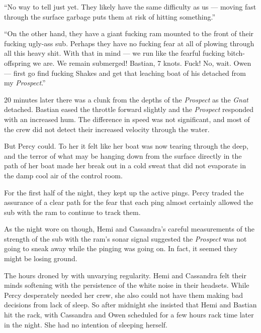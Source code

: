 \documentclass[]{scrbook}
\begin{document}
``No way to tell just yet. They likely have the same difficulty as us
--- moving fast through the surface garbage puts them at risk of hitting
something.''

``On the other hand, they have a giant fucking ram mounted to the front
of their fucking ugly-ass sub. Perhaps they have no fucking fear at all
of plowing through all this heavy shit. With that in mind --- we run
like the fearful fucking bitch-offspring we are. We remain submerged!
Bastian, 7 knots. Fuck! No, wait. Owen --- first go find fucking Shakes
and get that leaching boat of his detached from my \emph{Prospect}.''

20 minutes later there was a clunk from the depths of the
\emph{Prospect} as the \emph{Gnat} detached. Bastian eased the throttle
forward slightly and the \emph{Prospect} responded with an increased
hum. The difference in speed was not significant, and most of the crew
did not detect their increased velocity through the water.

But Percy could. To her it felt like her boat was now tearing through
the deep, and the terror of what may be hanging down from the surface
directly in the path of her boat made her break out in a cold sweat that
did not evaporate in the damp cool air of the control room.

For the first half of the night, they kept up the active pings. Percy
traded the assurance of a clear path for the fear that each ping almost
certainly allowed the sub with the ram to continue to track them.

As the night wore on though, Hemi and Cassandra's careful measurements
of the strength of the sub with the ram's sonar signal suggested the
\emph{Prospect} was not going to sneak away while the pinging was going
on. In fact, it seemed they might be losing ground.

The hours droned by with unvarying regularity. Hemi and Cassandra felt
their minds softening with the persistence of the white noise in their
headsets. While Percy desperately needed her crew, she also could not
have them making bad decisions from lack of sleep. So after midnight she
insisted that Hemi and Bastian hit the rack, with Cassandra and Owen
scheduled for a few hours rack time later in the night. She had no
intention of sleeping herself.
\end{document}
